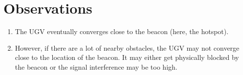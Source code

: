 \section{Observations}
\begin{enumerate}
    \item The UGV eventually converges close to the beacon (here, the hotspot).
    \item However, if there are a lot of nearby obstacles, the UGV may not 
    converge close to the location of the beacon. It may either get physically 
    blocked by the beacon or the signal interference may be too high.
\end{enumerate}
